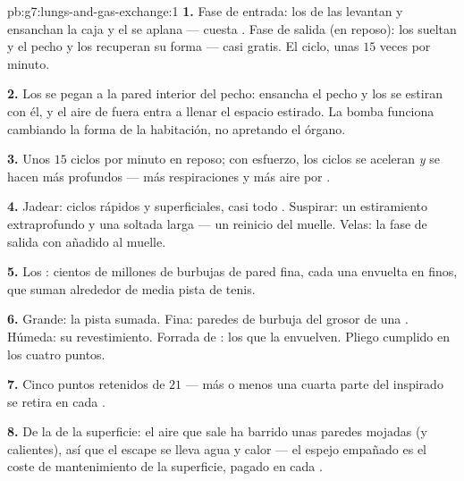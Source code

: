 \begin{solution}{pb:g7:lungs-and-gas-exchange:1}
\textbf{1.} Fase de entrada: los  de las  levantan y
ensanchan la caja y el  se aplana --- cuesta . Fase de
salida (en reposo): los  sueltan y el pecho y los 
recuperan su forma --- casi gratis. El ciclo, unas $15$ veces por
minuto.

\textbf{2.} Los  se pegan a la pared interior del pecho:
ensancha el pecho y los  se estiran con él, y el aire de fuera
entra a llenar el espacio estirado. La bomba funciona cambiando la
forma de la habitación, no apretando el órgano.

\textbf{3.} Unos $15$ ciclos por minuto en reposo; con esfuerzo, los
ciclos se aceleran \emph{y} se hacen más profundos --- más
respiraciones y más aire por .

\textbf{4.} Jadear: ciclos rápidos y superficiales, casi todo
. Suspirar: un estiramiento extraprofundo y una soltada larga
--- un reinicio del muelle. Velas: la fase de salida con 
añadido al muelle.

\textbf{5.} Los : cientos de millones de burbujas de pared
fina, cada una envuelta en  finos, que suman alrededor de media
pista de tenis.

\textbf{6.} Grande: la pista sumada. Fina: paredes de burbuja del
grosor de una . Húmeda: su revestimiento. Forrada de : los
 que la envuelven. Pliego cumplido en los cuatro puntos.

\textbf{7.} Cinco puntos retenidos de $21$ --- más o menos una cuarta
parte del  inspirado se retira en cada .

\textbf{8.} De la  de la superficie: el aire que sale ha barrido
unas paredes mojadas (y calientes), así que el escape se lleva agua y
calor --- el espejo empañado es el coste de mantenimiento de la
superficie, pagado en cada .


\end{solution}
